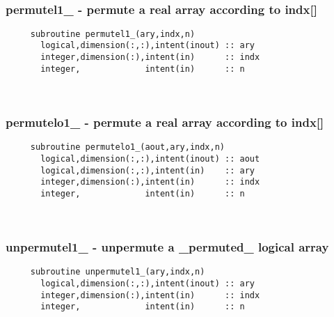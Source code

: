  
\mbox{}\hrulefill\ 
 

  \subsubsection{permutel1\_ - permute a real array according to indx[]}

\begin{verbatim} 
     subroutine permutel1_(ary,indx,n)
       logical,dimension(:,:),intent(inout) :: ary
       integer,dimension(:),intent(in)      :: indx
       integer,             intent(in)      :: n
 \end{verbatim}%
 
 
\mbox{}\hrulefill\ 
 

  \subsubsection{permutelo1\_ - permute a real array according to indx[]}

\begin{verbatim} 
     subroutine permutelo1_(aout,ary,indx,n)
       logical,dimension(:,:),intent(inout) :: aout
       logical,dimension(:,:),intent(in)    :: ary
       integer,dimension(:),intent(in)      :: indx
       integer,             intent(in)      :: n
 \end{verbatim}%
 
 
\mbox{}\hrulefill\ 
 

  \subsubsection{unpermutel1\_ - unpermute a \_permuted\_ logical array}

\begin{verbatim} 
     subroutine unpermutel1_(ary,indx,n)
       logical,dimension(:,:),intent(inout) :: ary
       integer,dimension(:),intent(in)      :: indx
       integer,             intent(in)      :: n
 \end{verbatim}%
 
